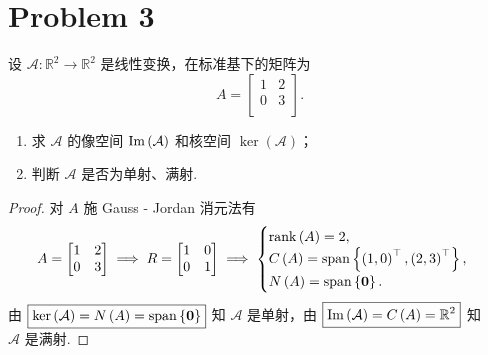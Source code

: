 \section*{Problem 3}

设 $\mathcal{A}: \mathbb{R}^2 \to \mathbb{R}^2$ 是线性变换，在标准基下的矩阵为
\[
A = \begin{bmatrix}
    1 & 2 \\
    0 & 3 \\
\end{bmatrix}.
\]
\begin{enumerate}
    \item 求 $\mathcal{A}$ 的像空间 $\mathrm{Im} \left(\mathcal{A}\right)$ 和核空间 $\ker \left(\mathcal{A}\right)$；
    \item 判断 $\mathcal{A}$ 是否为单射、满射.
\end{enumerate}

\begin{proof}
对 $A$ 施 Gauss - Jordan 消元法有
\[
A = \begin{bmatrix}
    1 & 2 \\
    0 & 3 \\
\end{bmatrix}
\implies
R = \begin{bmatrix}
    1 & 0 \\
    0 & 1 \\
\end{bmatrix}
\implies
\begin{cases}
    \mathrm{rank} \left(A\right) = 2, \\
    C \left(A\right) = \mathrm{span} \left\{\left(1, 0\right)^\top, \left(2, 3\right)^\top\right\}, \\
    N \left(A\right) = \mathrm{span} \left\{\boldsymbol{0}\right\}. \\
\end{cases}
\]
由 $\boxed{\ker \left(\mathcal{A}\right) = N \left(A\right) = \mathrm{span} \left\{\boldsymbol{0}\right\}}$ 知 $\boxed{\mathcal{A} \text{ 是单射}}$，由 $\boxed{\mathrm{Im} \left(\mathcal{A}\right) = C \left(A\right) = \mathbb{R}^2}$ 知 $\boxed{\mathcal{A} \text{ 是满射}}$.

\end{proof}
